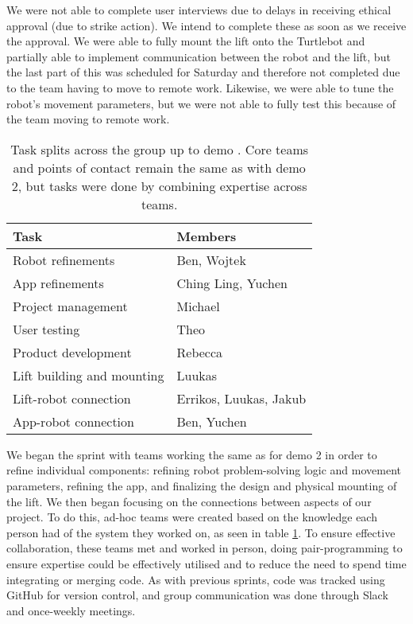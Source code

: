 \documentclass{article}
\begin{document}
We were not able to complete user interviews due to delays in receiving ethical approval (due to strike action). We intend to complete these as soon as we receive the approval. We were able to fully mount the lift onto the Turtlebot and partially able to implement communication between the robot and the lift, but the last part of this was scheduled for Saturday and therefore not completed due to the team having to move to remote work. Likewise, we were able to tune the robot's movement parameters, but we were not able to fully test this because of the team moving to remote work. 

\begin{table}[]
  \begin{tabular}{l|l}
    Task & Members \\
    \hline
    Robot refinements & Ben, Wojtek \\
    App refinements & Ching Ling, Yuchen \\
    Project management & Michael \\
    User testing & Theo \\
    Product development & Rebecca \\
    Lift building and mounting & Luukas \\
    Lift-robot connection & Errikos, Luukas, Jakub \\
    App-robot connection & Ben, Yuchen \\
  \end{tabular}
  \caption{Task splits across the group up to demo \demoNumber. Core teams and points of contact remain the same as with demo 2, but tasks were done by combining expertise across teams. }
  \label{tab:group-split}
\end{table}

We began the sprint with teams working the same as for demo 2 in order to refine individual components: refining robot problem-solving logic and movement parameters, refining the app, and finalizing the design and physical mounting of the lift. We then began focusing on the connections between aspects of our project. To do this, ad-hoc teams were created based on the knowledge each person had of the system they worked on, as seen in table \ref{tab:group-split}. To ensure effective collaboration, these teams met and worked in person, doing pair-programming to ensure expertise could be effectively utilised and to reduce the need to spend time integrating or merging code. As with previous sprints, code was tracked using GitHub for version control, and group communication was done through Slack and once-weekly meetings.
\end{document}
